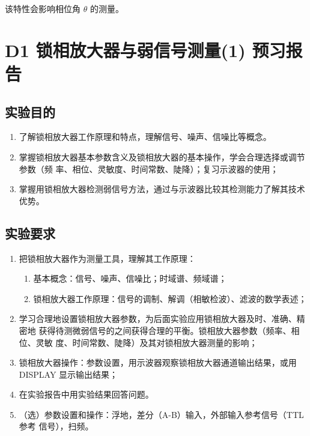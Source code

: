 \documentclass[dvipsnames, svgnames,a4paper,11pt]{article}
\begin{document}
	该特性会影响相位角 \(\theta\) 的测量。

	
	
	
	\clearpage
	\section{D1 锁相放大器与弱信号测量(1) \quad\heiti 预习报告}
	
	\subsection{实验目的}
	\begin{enumerate}
		\item 了解锁相放大器工作原理和特点，理解信号、噪声、信噪比等概念。
		\item 掌握锁相放大器基本参数含义及锁相放大器的基本操作，学会合理选择或调节参数（频
		率、相位、灵敏度、时间常数、陡降）；复习示波器的使用；
		\item 掌握用锁相放大器检测弱信号方法，通过与示波器比较其检测能力了解其技术优势。
	\end{enumerate}
	\subsection{实验要求}
	\begin{enumerate}
		\item 把锁相放大器作为测量工具，理解其工作原理：
		\begin{enumerate}
			\item 基本概念：信号、噪声、信噪比；时域谱、频域谱；
			\item 锁相放大器工作原理：信号的调制、解调（相敏检波）、滤波的数学表述；
		\end{enumerate}
		
		\item 学习合理地设置锁相放大器参数，为后面实验应用锁相放大器及时、准确、精密地
		获得待测微弱信号的之间获得合理的平衡。锁相放大器参数（频率、相位、灵敏
		度、时间常数、陡降）及其对锁相放大器测量的影响；
	
		\item 锁相放大器操作：参数设置，用示波器观察锁相放大器通道输出结果，或用
		DISPLAY 显示输出结果；
		
		\item 在实验报告中用实验结果回答问题。
		
		\item （选）参数设置和操作：浮地，差分（A-B）输入，外部输入参考信号（TTL 参考
		信号），扫频。
		
	\end{enumerate}
\end{document}
